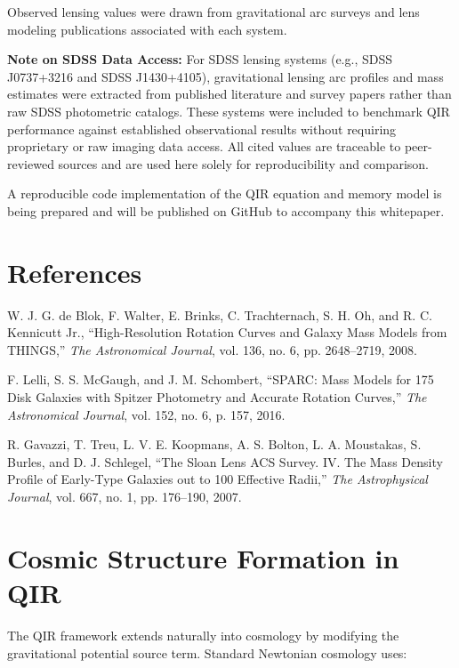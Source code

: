 \documentclass[11pt]{article}
\begin{document}
Observed lensing values were drawn from gravitational arc surveys and lens modeling publications associated with each system.

\textbf{Note on SDSS Data Access:} For SDSS lensing systems (e.g., SDSS J0737+3216 and SDSS J1430+4105), gravitational lensing arc profiles and mass estimates were extracted from published literature and survey papers rather than raw SDSS photometric catalogs. These systems were included to benchmark QIR performance against established observational results without requiring proprietary or raw imaging data access. All cited values are traceable to peer-reviewed sources and are used here solely for reproducibility and comparison.

A reproducible code implementation of the QIR equation and memory model is being prepared and will be published on GitHub to accompany this whitepaper.

\section*{References}
\begin{thebibliography}{9}

W. J. G. de Blok, F. Walter, E. Brinks, C. Trachternach, S. H. Oh, and R. C. Kennicutt Jr., 
“High-Resolution Rotation Curves and Galaxy Mass Models from THINGS,” 
\textit{The Astronomical Journal}, vol. 136, no. 6, pp. 2648–2719, 2008.

F. Lelli, S. S. McGaugh, and J. M. Schombert,
“SPARC: Mass Models for 175 Disk Galaxies with Spitzer Photometry and Accurate Rotation Curves,” 
\textit{The Astronomical Journal}, vol. 152, no. 6, p. 157, 2016.

R. Gavazzi, T. Treu, L. V. E. Koopmans, A. S. Bolton, L. A. Moustakas, S. Burles, and D. J. Schlegel,
“The Sloan Lens ACS Survey. IV. The Mass Density Profile of Early-Type Galaxies out to 100 Effective Radii,”
\textit{The Astrophysical Journal}, vol. 667, no. 1, pp. 176–190, 2007.

\end{thebibliography}

\newpage
\section{Cosmic Structure Formation in QIR}

The QIR framework extends naturally into cosmology by modifying the gravitational potential source term. Standard Newtonian cosmology uses:
\end{document}
